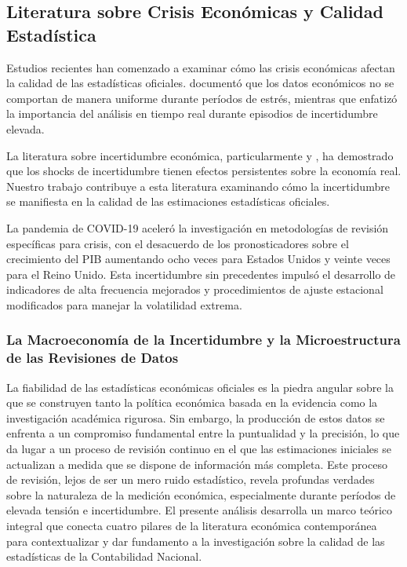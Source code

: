 \documentclass{article}
\begin{document}
\subsection{Literatura sobre Crisis Económicas y Calidad Estadística}

Estudios recientes han comenzado a examinar cómo las crisis económicas afectan la calidad de las estadísticas oficiales. \citet{aruoba2008} documentó que los datos económicos no se comportan de manera uniforme durante períodos de estrés, mientras que \citet{croushore2011} enfatizó la importancia del análisis en tiempo real durante episodios de incertidumbre elevada.

La literatura sobre incertidumbre económica, particularmente \citet{bloom2009} y \citet{baker2016}, ha demostrado que los shocks de incertidumbre tienen efectos persistentes sobre la economía real. Nuestro trabajo contribuye a esta literatura examinando cómo la incertidumbre se manifiesta en la calidad de las estimaciones estadísticas oficiales.

La pandemia de COVID-19 aceleró la investigación en metodologías de revisión específicas para crisis, con el desacuerdo de los pronosticadores sobre el crecimiento del PIB aumentando ocho veces para Estados Unidos y veinte veces para el Reino Unido. Esta incertidumbre sin precedentes impulsó el desarrollo de indicadores de alta frecuencia mejorados y procedimientos de ajuste estacional modificados para manejar la volatilidad extrema.

\subsubsection{La Macroeconomía de la Incertidumbre y la Microestructura de las Revisiones de Datos}

La fiabilidad de las estadísticas económicas oficiales es la piedra angular sobre la que se construyen tanto la política económica basada en la evidencia como la investigación académica rigurosa. Sin embargo, la producción de estos datos se enfrenta a un compromiso fundamental entre la puntualidad y la precisión, lo que da lugar a un proceso de revisión continuo en el que las estimaciones iniciales se actualizan a medida que se dispone de información más completa. Este proceso de revisión, lejos de ser un mero ruido estadístico, revela profundas verdades sobre la naturaleza de la medición económica, especialmente durante períodos de elevada tensión e incertidumbre. El presente análisis desarrolla un marco teórico integral que conecta cuatro pilares de la literatura económica contemporánea para contextualizar y dar fundamento a la investigación sobre la calidad de las estadísticas de la Contabilidad Nacional.
\end{document}
